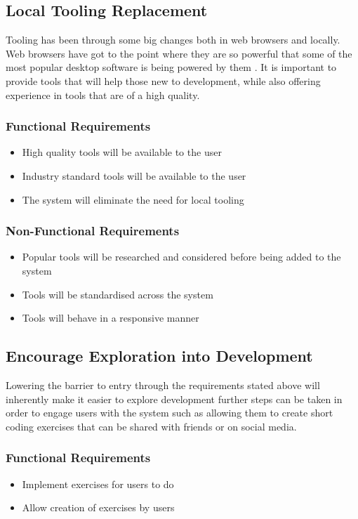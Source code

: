\subsection{Local Tooling Replacement}
Tooling has been through some big changes both in web browsers and locally. Web browsers have got to the point where they are so powerful that some of the most popular desktop software is being powered by them \cite{carlo}. It is important to provide tools that will help those new to development, while also offering experience in tools that are of a high quality.

\subsubsection{Functional Requirements}
\begin{itemize}
    \item High quality tools will be available to the user
    \item Industry standard tools will be available to the user
    \item The system will eliminate the need for local tooling
\end{itemize}
\subsubsection{Non-Functional Requirements}
\begin{itemize}
    \item Popular tools will be researched and considered before being added to the system
    \item Tools will be standardised across the system
    \item Tools will behave in a responsive manner
\end{itemize}

\subsection{Encourage Exploration into Development}
Lowering the barrier to entry through the requirements stated above will inherently make it easier to explore development further steps can be taken in order to engage users with the system such as allowing them to create short coding exercises that can be shared with friends or on social media.

\subsubsection{Functional Requirements}
\begin{itemize}
    \item Implement exercises for users to do
    \item Allow creation of exercises by users
\end{itemize}
